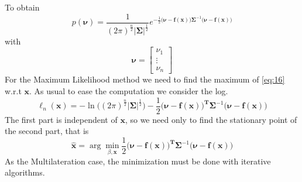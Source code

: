 \documentclass[12pt]{report}
\begin{document}
To obtain
\begin{equation}
    p(\boldsymbol{\nu})=\frac{1}{(2\pi)^{\frac{n}{2}}|\boldsymbol{\Sigma}|^{\frac{1}{2}}}e^{-\frac{1}{2}\big(\boldsymbol{\nu}-\mathbf{f}(\mathbf{x})\big)\boldsymbol{\Sigma}^{-1}\big(\boldsymbol{\nu}-\mathbf{f}(\mathbf{x})\big)}
    \label{eq:16}
\end{equation}
with 
\begin{equation}
    \boldsymbol{\nu}=\begin{bmatrix}
    \nu_1\\
    \vdots\\
    \nu_n
    \end{bmatrix}
\end{equation}
For the Maximum Likelihood method we need to find the maximum of \eqref{eq:16} w.r.t $\mathbf{x}$. As usual to ease the computation we consider the log. 
\begin{equation}
    \ell_n(\mathbf{x})=-\ln\big((2\pi)^{\frac{n}{2}}|\boldsymbol{\Sigma}|^{\frac{1}{2}}\big)-\frac{1}{2}\big(\boldsymbol{\nu}-\mathbf{f}(\mathbf{x})\big)^\mathbf{T}\boldsymbol{\Sigma}^{-1}\big(\boldsymbol{\nu}-\mathbf{f}(\mathbf{x})\big)
\end{equation}
The first part is independent of $\mathbf{x}$, so we need only to find the stationary point of the second part, that is 
\begin{equation}
\hat{\mathbf{x}}=\arg \min_{\beta,\mathbf{x}}\frac{1}{2}\big(\boldsymbol{\nu}-\mathbf{f}(\mathbf{x})\big)^\mathbf{T}\boldsymbol{\Sigma}^{-1}\big(\boldsymbol{\nu}-\mathbf{f}(\mathbf{x})\big)
\end{equation}
As the Multilateration case, the minimization must be done with iterative algorithms.

\clearpage
\end{document}
